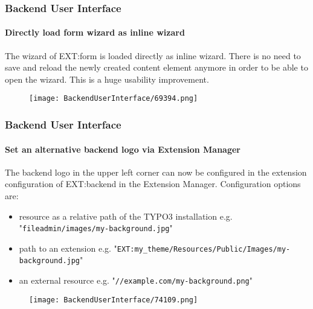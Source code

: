 \begin{frame}[fragile]
	\frametitle{Backend User Interface}
	\framesubtitle{Directly load form wizard as inline wizard}

	The wizard of EXT:form is loaded directly as inline wizard.
	There is no need to save and reload the newly created content element anymore
	in order to be able to open the wizard. This is a huge usability improvement.

	\begin{figure}
		\texttt{[image: BackendUserInterface/69394.png]}
	\end{figure}

\end{frame}

\begin{frame}[fragile]
	\frametitle{Backend User Interface}
	\framesubtitle{Set an alternative backend logo via Extension Manager}

	The backend logo in the upper left corner can now be configured in the extension configuration
	of EXT:backend in the Extension Manager.\newline
	Configuration options are:

	\begin{itemize}
		\item resource as a relative path of the TYPO3 installation\newline
			\smaller
				e.g. "\texttt{fileadmin/images/my-background.jpg}"
			\normalsize

		\item path to an extension\newline
			\smaller
				e.g. "\texttt{EXT:my\_theme/Resources/Public/Images/my-background.jpg}"
			\normalsize

		\item an external resource\newline
			\smaller
				e.g. "\texttt{//example.com/my-background.png}"
			\normalsize

	\end{itemize}

	\begin{figure}
		\texttt{[image: BackendUserInterface/74109.png]}
	\end{figure}

\end{frame}

